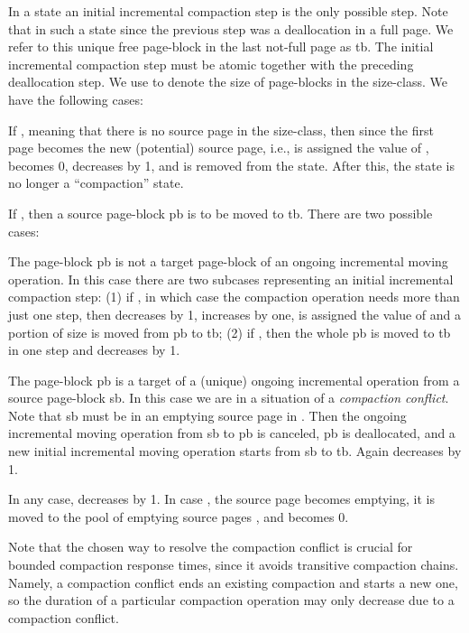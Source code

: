 \documentclass{amsart}
\begin{document}
In a state  an initial incremental compaction step is the only
possible step. Note that in such a state  since the
previous step was a deallocation in a full page.  We refer to this
unique free page-block in the last not-full page as \textsf{tb}.  The
initial incremental compaction step must be atomic together with the
preceding deallocation step. We use  to denote the
size of page-blocks in the size-class. We have the following cases:
\begin{list}{}{\leftmargin=1.2em}
\item[1.] If , meaning that there is no source page in the size-class, then since 
the first page becomes the new (potential) source page, i.e.,  is assigned the value of ,  becomes 0,  decreases by 1,
and  is removed
from the state. After this, the state is no longer a ``compaction'' state.
\item[2.] If , then a source page-block \textsf{pb} is to be moved to \textsf{tb}. There are two possible cases:
\begin{list}{}{\leftmargin=1.2em}
\item[-] The page-block \textsf{pb} is not a target page-block of an ongoing incremental moving operation. In this case
there are two subcases representing an initial incremental compaction step: (1) if , in which
case the compaction operation needs more than just one step, then
 decreases by 1,  increases by one,  is assigned the value of  and a portion of size  is moved from \textsf{pb} to
\textsf{tb}; (2) if , then the whole \textsf{pb} is moved to
\textsf{tb} in one step and  decreases by 1.
\item[-] The page-block \textsf{pb} is a target of a (unique) ongoing incremental operation from a source
page-block \textsf{sb}. In this case we are in a situation
of a \emph{compaction conflict}. Note that \textsf{sb} must be in an emptying source page in . Then the ongoing
incremental moving operation from \textsf{sb} to \textsf{pb} is canceled, \textsf{pb} is deallocated,
and a new initial incremental moving
operation starts from \textsf{sb} to \textsf{tb}. Again  decreases by 1.
\end{list}
In any case,  decreases by 1. In case , the source page becomes emptying, it is moved to
the pool of emptying source pages , and  becomes 0.
\end{list}
Note that the chosen way to resolve the compaction conflict is crucial for bounded compaction response times, since
it avoids transitive compaction chains. Namely, a compaction conflict ends an existing compaction and starts a new one, so
the duration of a particular compaction operation may only decrease due to a compaction conflict.
\end{document}
